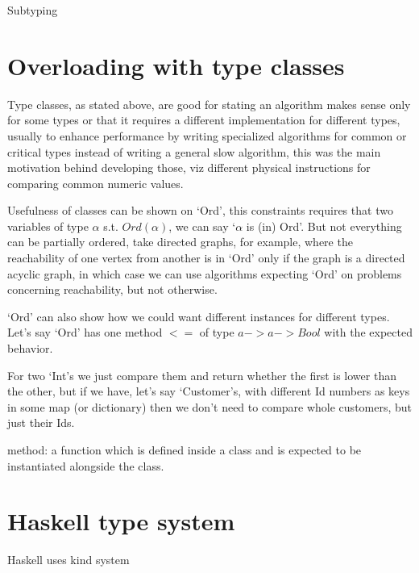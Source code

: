 Subtyping %

\section{Overloading with type classes}

Type classes, as stated above, are good for stating an algorithm makes sense only for some types or that it requires a different implementation for
different types, usually to enhance performance by writing specialized algorithms for common or critical types instead of writing a general slow algorithm,
this was the main motivation behind developing those, %
viz different physical instructions for comparing common numeric values.

Usefulness of classes can be shown on `Ord', this constraints requires that two variables of type $\alpha$ s.t. $Ord(\alpha)$, we can say `$\alpha$ is (in) Ord'.
But not everything can be partially ordered, take directed graphs, for example, where the reachability of one vertex from another is in `Ord' only
if the graph is a directed acyclic graph, in which case we can use algorithms expecting `Ord' on problems concerning reachability, but not otherwise.

`Ord' can also show how we could want different instances for different types.
Let's say `Ord' has one method $<=$ of type $a -> a -> Bool$ with the expected behavior. %

For two `Int's we just compare them and return whether the first is lower than the other,
but if we have, let's say `Customer's, with different Id numbers as keys in some map (or dictionary) then we don't need to compare whole customers,
but just their Ids.

method: a function which is defined inside a class and is expected to be instantiated alongside the class. %



\section{Haskell type system}

Haskell uses kind system %

